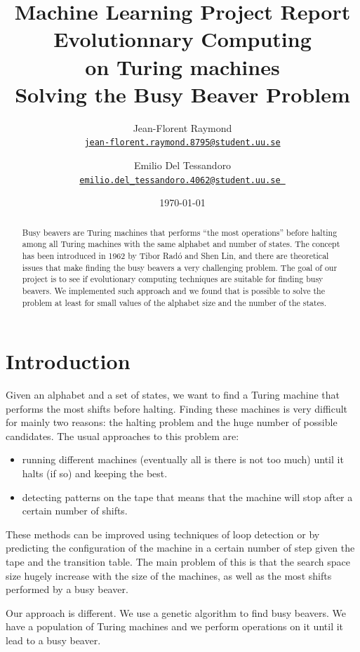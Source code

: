 \documentclass{report}
\title{Machine Learning Project Report\\\textbf{Evolutionnary Computing\\on Turing machines}\\{\Large Solving the Busy Beaver Problem}}
\author{Jean-Florent Raymond\\\href{mailto:jean-florent.raymond.8795@student.uu.se}{\texttt{jean-florent.raymond.8795@student.uu.se}} \and Emilio Del Tessandoro\\
  \href{mailto:emilio.del_tessandoro.4062@student.uu.se }{\texttt{emilio.del\_tessandoro.4062@student.uu.se }}}
\date{\today}
\begin{document}
\maketitle

\begin{abstract}

  Busy beavers are Turing machines that performs ``the most operations'' before halting among all Turing machines with the same alphabet and number of states. The concept has been introduced in 1962 by Tibor Radó and Shen Lin, and there are theoretical issues that make finding the busy beavers a very challenging problem.
The goal of our project is to see if evolutionary computing techniques are suitable for finding busy beavers. We implemented such approach and we found that is possible to solve the problem at least for small values of the alphabet size and the number of the states.

\end{abstract}

\chapter{Introduction}
\label{chap:intro}

Given an alphabet and a set of states, we want to find a Turing machine that performs the most shifts before halting. 
Finding these machines is very difficult for mainly two reasons: the halting problem and the huge number of possible candidates.
The usual approaches \cite{rado} to this problem are:
\begin{itemize}
\item running different machines (eventually all is there is not too much) until it halts (if so) and keeping the best.
\item detecting patterns on the tape that means that the machine will stop after a certain number of shifts.
\end{itemize}
These methods can be improved using techniques of loop detection or by predicting the configuration of the machine in a certain number of step given the tape and the transition table. The main problem of this is that the search space size hugely increase with the size of the machines, as well as the most shifts performed by a busy beaver.


Our approach is different. We use a genetic algorithm to find busy beavers. We have a population of Turing machines and we perform operations on it until it lead to a busy beaver.
\end{document}
